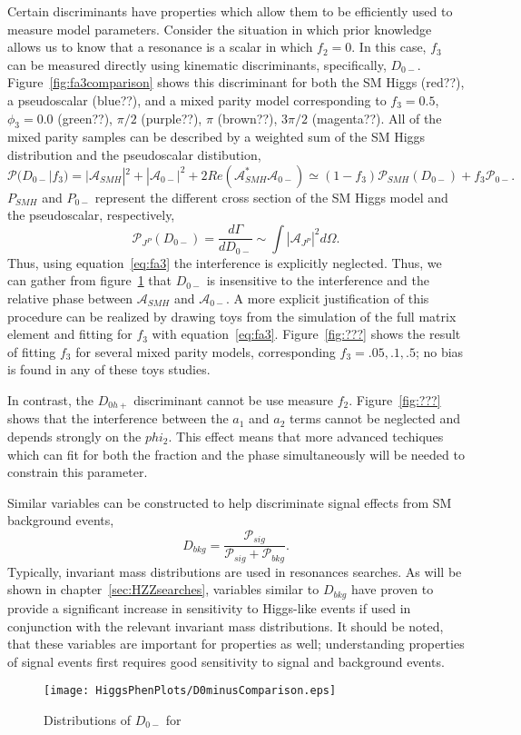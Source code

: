 Certain discriminants have properties which allow them to be efficiently
used to measure model parameters.  Consider the situation in which prior
knowledge allows us to know that a resonance is a scalar in which $f_2=0$.
In this case, $f_3$ can be measured directly using kinematic discriminants,
specifically, $D_{0-}$.  Figure~\ref{fig:fa3comparison} shows this discriminant for
both the SM Higgs (red??), a pseudoscalar (blue??), and a mixed parity 
model corresponding to $f_3=0.5$, $\phi_3=0.0$ (green??), $\pi/2$ (purple??),
$\pi$ (brown??), $3\pi/2$ (magenta??).  All of the mixed parity samples
can be described by a weighted sum of the SM Higgs distribution and the 
pseudoscalar distibution, 
\begin{equation}
\mathscr{P}(D_{0-}|f_3) = |\mathscr{A}_{SMH}|^2 + |\mathscr{A}_{0-}|^2 + 2Re(\mathscr{A}_{SMH}^*\mathscr{A}_{0-}) \simeq (1-f_3)\mathscr{P}_{SMH}(D_{0-})+f_3\mathscr{P}_{0-}.
\label{eq:fa3}
\end{equation}
$P_{SMH}$ and $P_{0-}$ represent the different cross section of the 
SM Higgs model and the pseudoscalar, respectively, 
\begin{equation}
\mathscr{P}_{J^P}(D_{0-}) = \frac{d\Gamma}{dD_{0-}} \sim \int |\mathscr{A}_{J^P}|^2d\Omega.
\end{equation}
Thus, using equation~\ref{eq:fa3} the interference is explicitly neglected.  
Thus, we can gather from figure~\ref{fig:fa3Comparison} that $D_{0-}$ is insensitive to
the interference and the relative phase between $\mathscr{A}_{SMH}$ and
$\mathscr{A}_{0-}$.  A more explicit justification of this procedure can be
realized by drawing toys from the simulation of the full matrix element and
fitting for $f_3$ with equation~\ref{eq:fa3}.  Figure~\ref{fig:???} shows
the result of fitting $f_3$ for several mixed parity models, corresponding 
$f_3=.05,.1,.5$; no bias is found in any of these toys studies.

In contrast, the $D_{0h+}$ discriminant cannot be use measure $f_2$.  
Figure~\ref{fig:???} shows that the interference between the $a_1$
and $a_2$ terms cannot be neglected and depends strongly on the $phi_2$.
This effect means that more advanced techiques which can fit for both the
fraction and the phase simultaneously will be needed to constrain this parameter.

Similar variables can be constructed to help discriminate signal effects 
from SM background events,
\begin{equation}
D_{bkg} = \frac{\mathscr{P}_{sig}}{\mathscr{P}_{sig}+\mathscr{P}_{bkg}}.
\end{equation}
Typically, invariant mass distributions are used in resonances searches. 
As will be shown in chapter~\ref{sec:HZZsearches}, variables similar to 
$D_{bkg}$ have proven to provide a significant increase in sensitivity to 
Higgs-like events if used in conjunction with the relevant invariant
mass distributions.  It should be noted, that these variables are important
for properties as well; understanding properties of signal events first
requires good sensitivity to signal and background events.  

\begin{figure}
\begin{center}
\texttt{[image: HiggsPhenPlots/D0minusComparison.eps]}
\label{fig:fa3Comparison}
\caption{Distributions of $D_{0-}$ for }
\end{center}
\end{figure}

